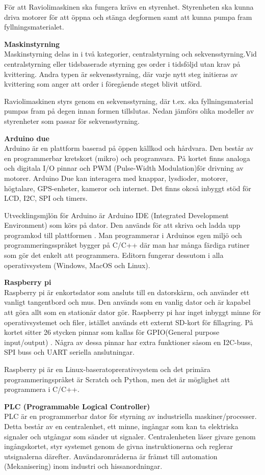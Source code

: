 För att Raviolimaskinen ska fungera krävs en styrenhet. Styrenheten ska kunna driva motorer för att öppna och stänga degformen samt att kunna pumpa fram fyllningsmaterialet.

\textbf{Maskinstyrning}\\
Maskinstyrning delas in  i två kategorier, centralstyrning och sekvensstyrning.Vid centralstyrning eller tidsbaserade styrning ges order i tidsföljd utan krav på kvittering. Andra typen är sekvensstyrning, där varje nytt steg initieras av kvittering som anger  att order i föregående steget blivit utförd.

Raviolimaskinen styrs genom en sekvensstyrning, där t.ex. ska fyllningsmaterial pumpas fram på degen innan formen tillslutas. Nedan jämförs olika modeller av styrenheter som passar för sekvensstyrning.

\textbf{Arduino due}\\
Arduino är en plattform baserad på öppen källkod och hårdvara. Den består av en  programmerbar kretskort (mikro) och programvara. På kortet finns analoga och digitala I/O pinnar och  PWM (Pulse-Width Modulation)för drivning av motorer. Arduino Due kan interagera med knappar, lysdioder, motorer, högtalare, GPS-enheter, kameror och internet. Det finns okcså inbyggt stöd för LCD, I2C, SPI och timers.

Utvecklingsmjlön för Arduino är Arduino IDE (Integrated Development Environment) som körs på  dator. Den används för att skriva och ladda upp programkod till plattformen \cite{Arduino1}. Man programmerar i Arduinos egen miljö och programmeringsspråket bygger på  C/C++ där man har många färdiga rutiner som gör det enkelt att programmera\cite{Arduino2}. Editorn fungerar dessutom i alla operativsystem (Windows, MacOS och Linux). 
 
\textbf{Raspberry pi}\\
Raspberry pi är enkortsdator som ansluts till en datorskärm, och använder ett vanligt tangentbord och mus. Den  används som en vanlig dator och  är kapabel att göra allt som en stationär dator gör. Raspberry pi har inget inbyggt minne för operativsystemet och filer, istället används ett externt SD-kort för fillagring. På kortet sitter 26 stycken pinnar som kallas för GPIO(General purpose input/output) . Några av dessa pinnar har extra funktioner såsom en I2C-buss, SPI buss och UART seriella anslutningar\cite{Raspberry1}.

Raspberry pi är en Linux-baseratoprerativsystem och det primära programmeringspråket är Scratch och Python, men det är möglighet att programmera i C/C++.

\textbf{PLC (Programmable Logical Controller) }\\
PLC är en programmerbar dator för styrning av industriella maskiner/processer. Detta består av en centralenhet, ett minne, ingångar som kan ta elektriska signaler och utgångar som sänder ut signaler. Centralenheten läser givare genom ingångskortet, styr systemet genom de givna instruktionerna och reglerar utsignalerna därefter. Användarområderna  är främst till automation (Mekanisering) inom industri och hissanordningar.
